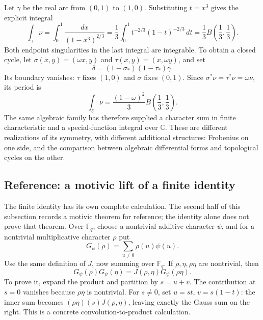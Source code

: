 \documentclass[11pt]{article}
\theoremstyle{remark}
\begin{document}
Let \(\gamma\) be the real arc from \((0,1)\) to \((1,0)\). Substituting \(t=x^3\) gives the explicit integral
\begin{equation}
\int_\gamma\nu
=\int_0^1\frac{dx}{(1-x^3)^{2/3}}
=\frac13\int_0^1t^{-2/3}(1-t)^{-2/3}\,dt
=\frac13B\!\left(\frac13,\frac13\right).
\label{fermat:beta}
\end{equation}
Both endpoint singularities in the last integral are integrable. To obtain a closed cycle, let \(\sigma(x,y)=(\omega x,y)\) and \(\tau(x,y)=(x,\omega y)\), and set
\[
\delta=(1-\sigma_*)(1-\tau_*)\gamma.
\]
Its boundary vanishes: \(\tau\) fixes \((1,0)\) and \(\sigma\) fixes \((0,1)\). Since \(\sigma^*\nu=\tau^*\nu=\omega\nu\), its period is
\begin{equation}
\int_\delta\nu
=\frac{(1-\omega)^2}{3}
B\!\left(\frac13,\frac13\right).
\label{fermat:closed-period}
\end{equation}
The same algebraic family has therefore supplied a character sum in finite characteristic and a special-function integral over \(\mathbb C\). These are different realizations of its symmetry, with different additional structures: Frobenius on one side, and the comparison between algebraic differential forms and topological cycles on the other.

\subsection{Reference: a motivic lift of a finite identity}

The finite identity has its own complete calculation. The second half of this subsection records a motivic theorem for reference; the identity alone does not prove that theorem. Over \(\mathbb F_q\), choose a nontrivial additive character \(\psi\), and for a nontrivial multiplicative character \(\rho\) put
\[
G_\psi(\rho)=\sum_{u\ne0}\rho(u)\psi(u).
\]
Use the same definition of \(J\), now summing over \(\mathbb F_q\). If \(\rho,\eta,\rho\eta\) are nontrivial, then
\begin{equation}
G_\psi(\rho)G_\psi(\eta)
=J(\rho,\eta)G_\psi(\rho\eta).
\label{fermat:gauss-jacobi}
\end{equation}
To prove it, expand the product and partition by \(s=u+v\). The contribution at \(s=0\) vanishes because \(\rho\eta\) is nontrivial. For \(s\ne0\), set \(u=st\), \(v=s(1-t)\): the inner sum becomes \((\rho\eta)(s)J(\rho,\eta)\), leaving exactly the Gauss sum on the right. This is a concrete convolution-to-product calculation.
\end{document}
